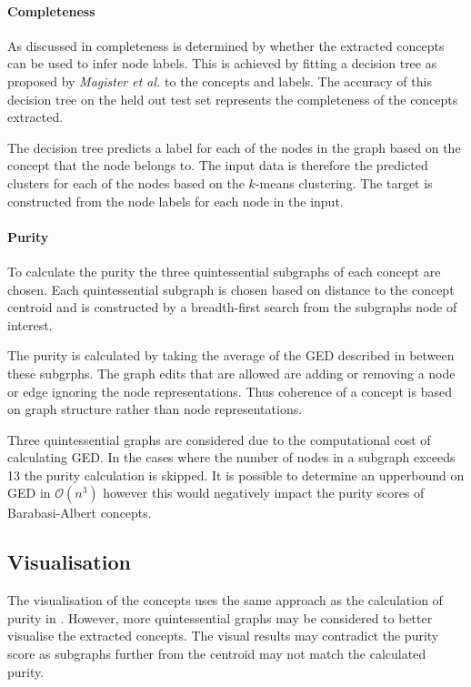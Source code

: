 \paragraph{Completeness}
As discussed in  completeness is determined by whether the extracted concepts can be used to infer node labels.
This is achieved by fitting a decision tree\cite{kazhdan2020now} as proposed by \textit{Magister et al.}\cite{magister2021gcexplainer} to the concepts and labels.
The accuracy of this decision tree on the held out test set represents the completeness of the concepts extracted.

The decision tree predicts a label for each of the nodes in the graph based on the concept that the node belongs to.
The input data is therefore the predicted clusters for each of the nodes based on the $k$-means clustering.
The target is constructed from the node labels for each node in the input.

\paragraph{Purity}
To calculate the purity the three quintessential subgraphs of each concept are chosen.
Each quintessential subgraph is chosen based on distance to the concept centroid and is constructed by a breadth-first search from the subgraphs node of interest.

The purity is calculated by taking the average of the GED described in  between these subgrphs.
The graph edits that are allowed are adding or removing a node or edge ignoring the node representations.
Thus coherence of a concept is based on graph structure rather than node representations.

Three quintessential graphs are considered due to the computational cost of calculating GED.
In the cases where the number of nodes in a subgraph exceeds 13 the purity calculation is skipped.
It is possible to determine an upperbound on GED in $\mathcal{O}(n^3)$ however this would negatively impact the purity scores of Barabasi-Albert concepts.

\subsection{Visualisation}
\label{sec:vis}
The visualisation of the concepts uses the same approach as the calculation of purity in .
However, more quintessential graphs may be considered to better visualise the extracted concepts.
The visual results may contradict the purity score as subgraphs further from the centroid may not match the calculated purity.

